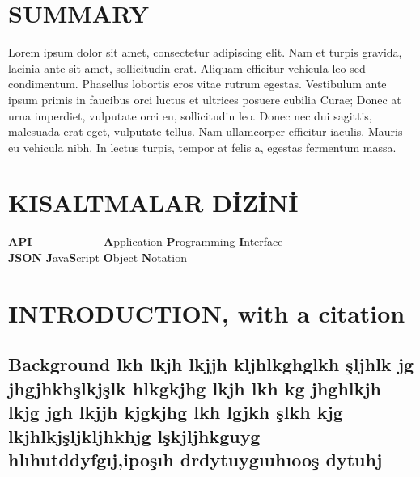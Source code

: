 \documentclass[12pt,turkish,a4paperpaper,]{report}
\begin{document}
\hypertarget{summary}{%
\chapter*{SUMMARY}\label{summary}}

Lorem ipsum dolor sit amet, consectetur adipiscing elit. Nam et turpis
gravida, lacinia ante sit amet, sollicitudin erat. Aliquam efficitur
vehicula leo sed condimentum. Phasellus lobortis eros vitae rutrum
egestas. Vestibulum ante ipsum primis in faucibus orci luctus et
ultrices posuere cubilia Curae; Donec at urna imperdiet, vulputate orci
eu, sollicitudin leo. Donec nec dui sagittis, malesuada erat eget,
vulputate tellus. Nam ullamcorper efficitur iaculis. Mauris eu vehicula
nibh. In lectus turpis, tempor at felis a, egestas fermentum massa.
\listoftables

\hypertarget{kisaltmalar-dizini}{%
\chapter*{KISALTMALAR DİZİNİ}\label{kisaltmalar-dizini}}

\begin{tabbing}
\textbf{API}~~~~~~~~~~~~ \= \textbf{A}pplication \textbf{P}rogramming \textbf{I}nterface \\  
\textbf{JSON} \> \textbf{J}ava\textbf{S}cript \textbf{O}bject \textbf{N}otation \\  
\end{tabbing}

\hypertarget{introduction-with-a-citation}{%
\chapter{INTRODUCTION, with a
citation}\label{introduction-with-a-citation}}

\pagestyle{main}
\thispagestyle{empty}

\hypertarget{background-lkh-lkjh-lkjjh-kljhlkghglkh-ux15fljhlk-jg-jhgjhkhux15flkjux15flk-hlkgkjhg-lkjh-lkh-kg-jhghlkjh-lkjg-jgh-lkjjh-kjgkjhg-lkh-lgjkh-ux15flkh-kjg-lkjhlkjux15fljkljhkhjg-lux15fkjljhkguyg-hlux131hutddyfgux131jipoux15fux131h-drdytuygux131uhux131ooux15f-dytuhj}{%
\section{Background lkh lkjh lkjjh kljhlkghglkh şljhlk jg jhgjhkhşlkjşlk
hlkgkjhg lkjh lkh kg jhghlkjh lkjg jgh lkjjh kjgkjhg lkh lgjkh şlkh kjg
lkjhlkjşljkljhkhjg lşkjljhkguyg hlıhutddyfgıj,ipoşıh drdytuygıuhıooş
dytuhj}\label{background-lkh-lkjh-lkjjh-kljhlkghglkh-ux15fljhlk-jg-jhgjhkhux15flkjux15flk-hlkgkjhg-lkjh-lkh-kg-jhghlkjh-lkjg-jgh-lkjjh-kjgkjhg-lkh-lgjkh-ux15flkh-kjg-lkjhlkjux15fljkljhkhjg-lux15fkjljhkguyg-hlux131hutddyfgux131jipoux15fux131h-drdytuygux131uhux131ooux15f-dytuhj}}
\end{document}
